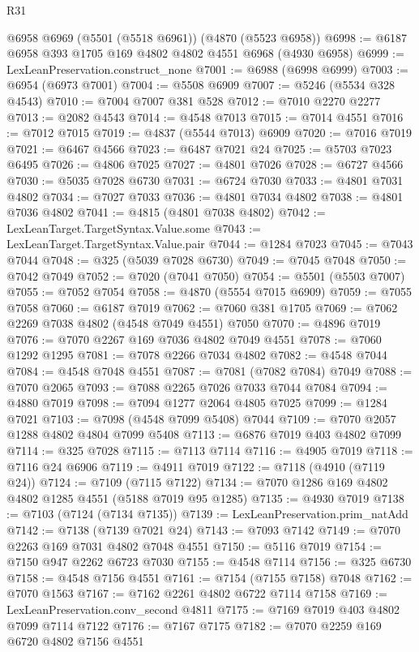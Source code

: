 \begin{lexlean}{R31}
\begin{coremodule}
    @6958
    @6969
    (@5501 (@5518 @6961))
    (@4870 (@5523 @6958))
@6998 := @6187 @6958 @393 @1705 @169 @4802 @4802 @4551 @6968 (@4930 @6958)
@6999 := LexLeanPreservation.construct_none
@7001 := @6988 (@6998 @6999)
@7003 := @6954 (@6973 @7001)
@7004 := @5508 @6909
@7007 := @5246 (@5534 @328 @4543)
@7010 := @7004 @7007 @381 @528
@7012 := @7010 @2270 @2277
@7013 := @2082 @4543
@7014 := @4548 @7013
@7015 := @7014 @4551
@7016 := @7012 @7015
@7019 := @4837 (@5544 @7013) @6909
@7020 := @7016 @7019
@7021 := @6467 @4566
@7023 := @6487 @7021 @24
@7025 := @5703 @7023 @6495
@7026 := @4806 @7025
@7027 := @4801 @7026
@7028 := @6727 @4566
@7030 := @5035 @7028 @6730
@7031 := @6724 @7030
@7033 := @4801 @7031 @4802
@7034 := @7027 @7033
@7036 := @4801 @7034 @4802
@7038 := @4801 @7036 @4802
@7041 := @4815 (@4801 @7038 @4802)
@7042 := LexLeanTarget.TargetSyntax.Value.some
@7043 := LexLeanTarget.TargetSyntax.Value.pair
@7044 := @1284 @7023
@7045 := @7043 @7044
@7048 := @325 (@5039 @7028 @6730)
@7049 := @7045 @7048
@7050 := @7042 @7049
@7052 := @7020 (@7041 @7050)
@7054 := @5501 (@5503 @7007)
@7055 := @7052 @7054
@7058 := @4870 (@5554 @7015 @6909)
@7059 := @7055 @7058
@7060 := @6187 @7019
@7062 := @7060 @381 @1705
@7069 := @7062 @2269 @7038 @4802 (@4548 @7049 @4551) @7050
@7070 := @4896 @7019
@7076 := @7070 @2267 @169 @7036 @4802 @7049 @4551
@7078 := @7060 @1292 @1295
@7081 := @7078 @2266 @7034 @4802
@7082 := @4548 @7044
@7084 := @4548 @7048 @4551
@7087 := @7081 (@7082 @7084) @7049
@7088 := @7070 @2065
@7093 := @7088 @2265 @7026 @7033 @7044 @7084
@7094 := @4880 @7019
@7098 := @7094 @1277 @2064 @4805 @7025
@7099 := @1284 @7021
@7103 := @7098 (@4548 @7099 @5408) @7044
@7109 := @7070 @2057 @1288 @4802 @4804 @7099 @5408
@7113 := @6876 @7019 @403 @4802 @7099
@7114 := @325 @7028
@7115 := @7113 @7114
@7116 := @4905 @7019
@7118 := @7116 @24 @6906
@7119 := @4911 @7019
@7122 := @7118 (@4910 (@7119 @24))
@7124 := @7109 (@7115 @7122)
@7134 := @7070 @1286 @169 @4802 @4802 @1285 @4551 (@5188 @7019 @95 @1285)
@7135 := @4930 @7019
@7138 := @7103 (@7124 (@7134 @7135))
@7139 := LexLeanPreservation.prim_natAdd
@7142 := @7138 (@7139 @7021 @24)
@7143 := @7093 @7142
@7149 := @7070 @2263 @169 @7031 @4802 @7048 @4551
@7150 := @5116 @7019
@7154 := @7150 @947 @2262 @6723 @7030
@7155 := @4548 @7114
@7156 := @325 @6730
@7158 := @4548 @7156 @4551
@7161 := @7154 (@7155 @7158) @7048
@7162 := @7070 @1563
@7167 := @7162 @2261 @4802 @6722 @7114 @7158
@7169 := LexLeanPreservation.conv_second @4811
@7175 := @7169 @7019 @403 @4802 @7099 @7114 @7122
@7176 := @7167 @7175
@7182 := @7070 @2259 @169 @6720 @4802 @7156 @4551

\end{coremodule}
\end{lexlean}
